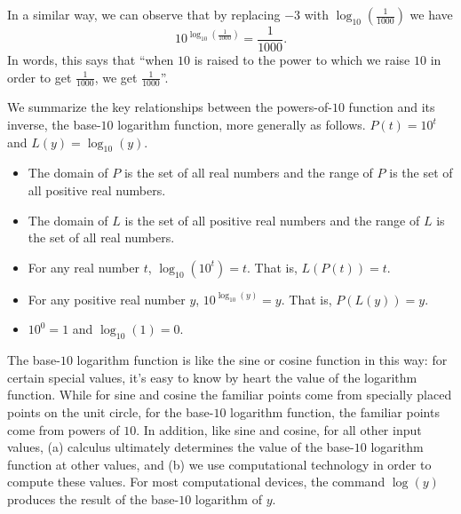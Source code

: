 \documentclass[nooutcomes]{ximera}
\begin{document}
In a similar way, we can observe that by replacing \(-3\) with \(\log_{10}(\frac{1}{1000})\) we have%
\begin{equation}
10^{\log_{10}(\frac{1}{1000})} = \frac{1}{1000}\text{.}\label{eq-exp-log-base-10-minus-3-undo}
\end{equation}
In words, this says that ``when \(10\) is raised to the power to which we raise \(10\) in order to get \(\frac{1}{1000}\), we get \(\frac{1}{1000}\)''.%

We summarize the key relationships between the powers-of-\(10\) function and its inverse, the base-\(10\) logarithm function, more generally as follows.%
{\(P(t) = 10^t\) and \(L(y) = \log_{10}(y)\).}
\begin{itemize}[label=\textbullet]
\item
The domain of \(P\) is the set of all real numbers and the range of \(P\) is the set of all positive real numbers.%
\item
The domain of \(L\) is the set of all positive real numbers and the range of \(L\) is the set of all real numbers.%
\item
For any real number \(t\), \(\log_{10}(10^t) = t\).  That is, \(L(P(t)) = t\).%
\item
For any positive real number \(y\), \(10^{\log_{10}(y)} = y\).  That is, \(P(L(y)) = y\).%
\item
\(10^0 = 1\) and \(\log_{10}(1) = 0\).%
\end{itemize}

The base-\(10\) logarithm function is like the sine or cosine function in this way:  for certain special values, it's easy to know by heart the value of the logarithm function.  While for sine and cosine the familiar points come from specially placed points on the unit circle, for the base-\(10\) logarithm function, the familiar points come from powers of \(10\). In addition, like sine and cosine, for all other input values, (a) calculus ultimately determines the value of the base-\(10\) logarithm function at other values, and (b) we use computational technology in order to compute these values.  For most computational devices, the command $\log(y)$ produces the result of the base-\(10\) logarithm of \(y\).%
\end{document}
